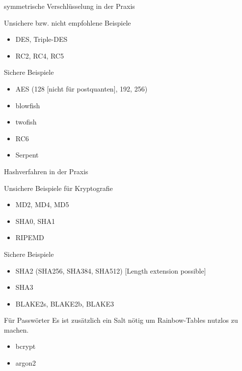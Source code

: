 \documentclass[10pt]{beamer}
\begin{document}
	\begin{frame}{symmetrische Verschlüsselung in der Praxis}
		\begin{alertblock}{Unsichere bzw. nicht empfohlene Beispiele}
			\begin{itemize}
				\color{red}
				\item DES, Triple-DES
				\item RC2, RC4, RC5
			\end{itemize}
		\end{alertblock}
		\begin{alertblock}{Sichere Beispiele}
			\begin{itemize}
				\color{darkgreen}
				\item AES (128 [nicht für postquanten], 192, 256)
				\item blowfish
				\item twofish
				\item RC6
				\item Serpent
			\end{itemize}
		\end{alertblock}
	\end{frame}
	
	\begin{frame}{Hashverfahren in der Praxis}
		\begin{alertblock}{Unsichere Beispiele für Kryptografie}
			\begin{itemize}
				\color{red}
				\item MD2, MD4, MD5
				\item SHA0, SHA1
				\item RIPEMD
			\end{itemize}
		\end{alertblock}
		\begin{alertblock}{Sichere Beispiele}
			\begin{itemize}
				\color{darkgreen}
				\item SHA2 (SHA256, SHA384, SHA512) [Length extension possible]
				\item SHA3
				\item BLAKE2s, BLAKE2b, BLAKE3
			\end{itemize}
		\end{alertblock}
		\begin{alertblock}{Für Passwörter}
			\vspace{0.1cm}
			Es ist zusätzlich ein Salt nötig um Rainbow-Tables nutzlos zu machen.
			\vspace{-0.2cm}
			
		\begin{itemize}
			\color{darkgreen}
			\item bcrypt
			\item argon2
		\end{itemize}
	\end{alertblock}
	\end{frame}
	
\end{document}
